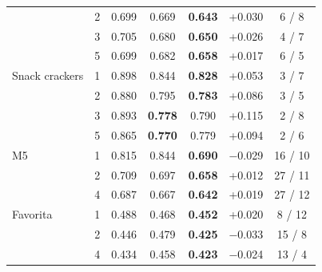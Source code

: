 \begin{table}[t]
\begin{tabular}{lrcccrc}
 & 2 & 0.699 & 0.669 & \textbf{0.643} & +0.030 & 6 / 8 \\
 & 3 & 0.705 & 0.680 & \textbf{0.650} & +0.026 & 4 / 7 \\
 & 5 & 0.699 & 0.682 & \textbf{0.658} & +0.017 & 6 / 5 \\
\addlinespace[2pt]
Snack crackers & 1 & 0.898 & 0.844 & \textbf{0.828} & +0.053 & 3 / 7 \\
 & 2 & 0.880 & 0.795 & \textbf{0.783} & +0.086 & 3 / 5 \\
 & 3 & 0.893 & \textbf{0.778} & 0.790 & +0.115 & 2 / 8 \\
 & 5 & 0.865 & \textbf{0.770} & 0.779 & +0.094 & 2 / 6 \\
\addlinespace[2pt]
M5 & 1 & 0.815 & 0.844 & \textbf{0.690} & $-$0.029 & 16 / 10 \\
 & 2 & 0.709 & 0.697 & \textbf{0.658} & +0.012 & 27 / 11 \\
 & 4 & 0.687 & 0.667 & \textbf{0.642} & +0.019 & 27 / 12 \\
\addlinespace[2pt]
Favorita & 1 & 0.488 & 0.468 & \textbf{0.452} & +0.020 & 8 / 12 \\
 & 2 & 0.446 & 0.479 & \textbf{0.425} & $-$0.033 & 15 / 8 \\
 & 4 & 0.434 & 0.458 & \textbf{0.423} & $-$0.024 & 13 / 4 \\
\bottomrule
\end{tabular}
\end{table}
